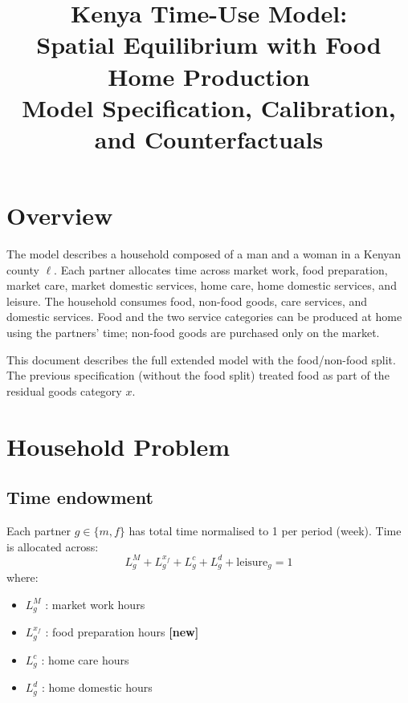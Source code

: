 \documentclass[11pt,a4paper]{article}
\title{\textbf{Kenya Time-Use Model:\\ Spatial Equilibrium with Food Home Production}\\[6pt]
\large Model Specification, Calibration, and Counterfactuals}
\author{}\date{}
\begin{document}
\maketitle\thispagestyle{empty}
\tableofcontents\newpage

\section{Overview}

The model describes a household composed of a man and a woman in a Kenyan
county $\ell$. Each partner allocates time across market work, food
preparation, market care, market domestic services, home care, home
domestic services, and leisure. The household consumes food, non-food
goods, care services, and domestic services. Food and the two service
categories can be produced at home using the partners' time; non-food
goods are purchased only on the market.

This document describes the full extended model with the food/non-food
split. The previous specification (without the food split) treated food
as part of the residual goods category $x$.

\section{Household Problem}

\subsection{Time endowment}

Each partner $g \in \{m, f\}$ has total time normalised to 1 per period
(week). Time is allocated across:
\[
  L^M_g + L^{x_f}_g + L^c_g + L^d_g + \text{leisure}_g = 1
\]
where:
\begin{itemize}[noitemsep]
  \item $L^M_g$ : market work hours
  \item $L^{x_f}_g$ : food preparation hours \textbf{[new]}
  \item $L^c_g$ : home care hours
  \item $L^d_g$ : home domestic hours
\end{itemize}
\end{document}
